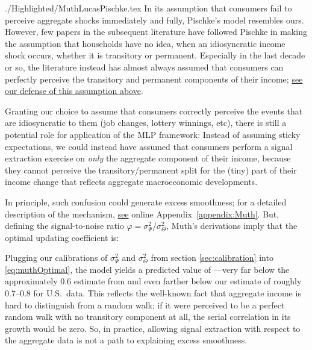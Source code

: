 \begin{verbatimwrite}{./Highlighted/MuthLucasPischke.tex}
In its assumption that consumers fail to perceive aggregate shocks immediately and fully, Pischke's model resembles ours.  However, few papers in the subsequent literature have followed Pischke in making the assumption that households have no idea, when an idiosyncratic income shock occurs, whether it is transitory or permanent.  Especially in the last decade or so, the literature instead has almost always assumed that consumers can perfectly perceive the transitory and permanent components of their income; \hyperlink{Why-Consumers-See-Individual-Shocks}{see our defense of this assumption above}.

Granting our choice to assume that consumers correctly perceive the events that are idiosyncratic to them (job changes, lottery winnings, etc), there is still a potential role for application of the MLP framework:  Instead of assuming sticky expectations, we could instead have assumed that consumers perform a signal extraction exercise on \textit{only} the aggregate component of their income, because they cannot perceive the transitory/permanent split for the (tiny) part of their income change that reflects aggregate macroeconomic developments.

In principle, such confusion could generate excess smoothness; for a detailed description of the mechanism, \hyperlink{MuthLucasPischke}{see} online Appendix~\ref{appendix:Muth}.  But, defining the signal-to-noise ratio $\varphi=\sigma^2_{\Psi}/\sigma^2_{\Theta}$, Muth's derivations imply that the optimal updating coefficient is:
 
\newcommand{\PischkePi}{0.83}
\newcommand{\PischkePiCancel}{0.17}
 \newcommand{\fromFile}{false}
 \newcommand{\FileOrNot}{\ifthenelse{\boolean{\fromFile}}}
Plugging our calibrations of $\sigma^2_{\Psi}$ and $\sigma^2_{\Theta}$ from section \ref{sec:calibration} into \eqref{eq:muthOptimal}, the model yields a predicted value of \FileOrNot{$1-\Pi \approx \PischkePiCancel$}{$(1-\Pi) \approx \PischkePiCancel $}---very far below the approximately $0.6$ estimate from \cite{hrsHabit} and even farther below our estimate of roughly $0.7$--$0.8$ for U.S.\ data.  This reflects the well-known fact that aggregate income is hard to distinguish from a random walk; if it were perceived to be a perfect random walk with no transitory component at all, the serial correlation in its growth would be zero.  So, in practice, allowing signal extraction with respect to the aggregate data is not a path to explaining excess smoothness.


\end{verbatimwrite}
